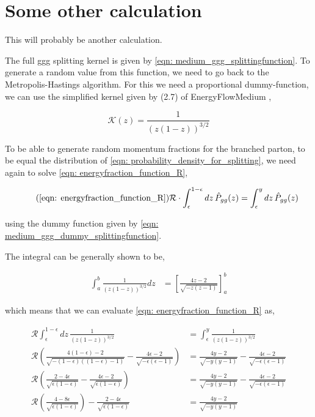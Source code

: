 \documentclass[main.tex]{subfiles}
\begin{document}
\section{Some other calculation}
This will probably be another calculation.



The full ggg splitting kernel is given by \autoref{eqn: medium_ggg_splittingfunction}.
To generate a random value from this function, we need to go back to the Metropolis-Hastings algorithm. 
For this we need a proportional dummy-function, we can use the simplified kernel given by (2.7) of EnergyFlowMedium \cite{Energy_flow_medium_cascade_2016}, 

\begin{equation}\label{eqn: medium_ggg_dummy_splittingfunction}
    \mathcal{K}(z) = \frac{1}{(z(1-z))^{3/2}}
\end{equation}

To be able to generate random momentum fractions for the branched parton, to be equal the distribution of \autoref{eqn: probability_density_for_splitting}, we need again to solve \autoref{eqn: energyfraction_function_R},

\begin{equation}\tag{\ref{eqn: energyfraction_function_R}}
    \mathcal{R} \cdot \int_\epsilon^{1-\epsilon} dz \, \hat{P}_{gg}(z) = \int_\epsilon^{y}dz \, \hat{P}_{gg}(z)
\end{equation}

using the dummy function given by \autoref{eqn: medium_ggg_dummy_splittingfunction}.

The integral can be generally shown to be, 

\begin{align}
    \int_a^b \frac{1}{(z(1-z))^{3/2}}dz &= \left[ \frac{4z-2}{\sqrt{-z(z-1)}} \right]_a^b
\end{align}

which means that we can evaluate \autoref{eqn: energyfraction_function_R} as,

\begin{align}
    \mathcal{R} \int_\epsilon^{1-\epsilon} dz \, \frac{1}{(z(1-z))^{3/2}} &= \int_\epsilon^{y} \frac{1}{(z(1-z))^{3/2}} \nonumber \\
    \mathcal{R} \left(  \frac{4(1-\epsilon)-2}{\sqrt{-(1-\epsilon)((1-\epsilon)-1)}} - \frac{4\epsilon-2}{\sqrt{-\epsilon(\epsilon-1)}} \right) &= \frac{4y-2}{\sqrt{-y(y-1)}} - \frac{4\epsilon-2}{\sqrt{-\epsilon(\epsilon-1)}} \nonumber\\
    \mathcal{R} \left(  \frac{2-4\epsilon}{\sqrt{\epsilon(1-\epsilon)}} - \frac{4\epsilon-2}{\sqrt{\epsilon(1-\epsilon)}} \right) &= \frac{4y-2}{\sqrt{-y(y-1)}} - \frac{4\epsilon-2}{\sqrt{-\epsilon(\epsilon-1)}} \nonumber\\
    \mathcal{R} \left(  \frac{4-8\epsilon}{\sqrt{\epsilon(1-\epsilon)}} \right) - \frac{2-4\epsilon}{\sqrt{\epsilon(1-\epsilon)}} &= \frac{4y-2}{\sqrt{-y(y-1)}} 
\end{align}
\end{document}
